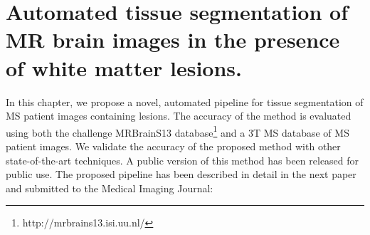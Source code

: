 
\chapter{Automated tissue segmentation of MR brain images in the presence of white
matter lesions.}  

\label{chapter:chapter_6}

In this chapter, we propose a novel, automated pipeline for tissue segmentation of MS patient images containing lesions. The accuracy of the method is evaluated using both the challenge MRBrainS13 database\footnote{http://mrbrains13.isi.uu.nl/} and a 3T MS database of MS patient images. We validate the accuracy of the proposed method with other state-of-the-art techniques. A public version of this method has been released for public use.  The proposed pipeline has been described in detail in the next paper and submitted to the Medical Imaging Journal:

\vspace{2cm}

\noindent{}

%





